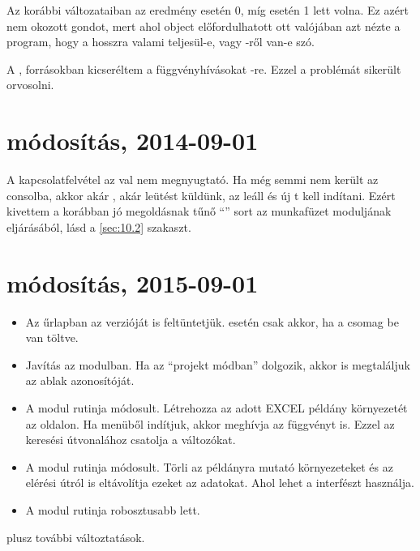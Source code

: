 Az  korábbi változataiban az eredmény  esetén 0,
míg  esetén 1 lett volna.
Ez azért nem okozott gondot, mert
ahol   object előfordulhatott ott valójában azt
nézte a program, hogy a hosszra valami teljesül-e, vagy
-ről van-e szó. 

A ,  forrásokban kicseréltem a 
függvényhívásokat -re. Ezzel a problémát sikerült
orvosolni.
 
\section{ módosítás, 2014-09-01}

A kapcsolatfelvétel az val nem megnyugtató. Ha még semmi nem
került az  consolba, akkor akár , akár 
leütést küldünk, az  leáll és új t kell indítani.
Ezért kivettem a korábban jó megoldásnak tűnő ``'' sort az  munkafüzet 
moduljának  eljárásából, lásd a \ref{sec:10.2} szakaszt.

\section{ módosítás, 2015-09-01}

\begin{itemize}
\item Az  űrlapban az  verzióját is
  feltüntetjük.  esetén csak akkor, ha a 
  csomag be van töltve.
\item Javítás az  modulban. Ha az  ``projekt
  módban'' dolgozik, akkor is megtaláljuk az ablak azonosítóját.  
\item A   modul  rutinja
  módosult. Létrehozza
  az adott EXCEL példány környezetét az  oldalon. Ha menüből
  indítjuk, akkor meghívja az  függvényt is. Ezzel az 
  keresési útvonalához csatolja a 
  változókat.
\item  A   modul  rutinja
  módosult. Törli az  példányra mutató környezeteket és az
  elérési útról is eltávolítja ezeket az adatokat. Ahol lehet a 
  interfészt használja.
\item A   modul  rutinja
  robosztusabb lett.
\end{itemize}
plusz további változtatások.
